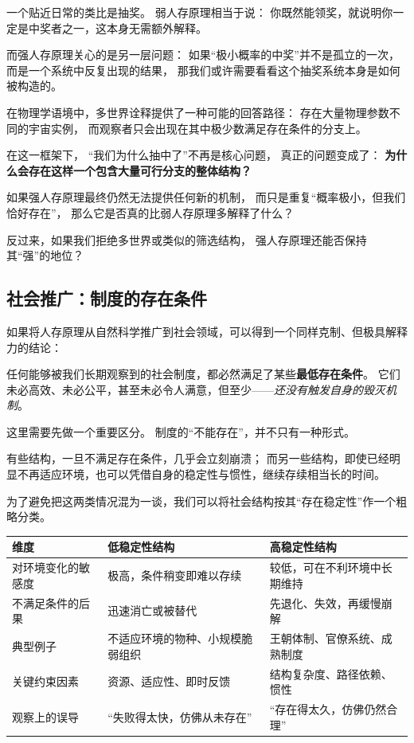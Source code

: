\documentclass[../main.tex]{subfiles}
\begin{document}
一个贴近日常的类比是抽奖。  
弱人存原理相当于说：  
你既然能领奖，就说明你一定是中奖者之一，这本身无需额外解释。

而强人存原理关心的是另一层问题：  
如果“极小概率的中奖”并不是孤立的一次，  
而是一个系统中反复出现的结果，  
那我们或许需要看看这个抽奖系统本身是如何被构造的。

在物理学语境中，多世界诠释提供了一种可能的回答路径：  
存在大量物理参数不同的宇宙实例，  
而观察者只会出现在其中极少数满足存在条件的分支上。

在这一框架下，  
“我们为什么抽中了”不再是核心问题，  
真正的问题变成了：  
\textbf{为什么会存在这样一个包含大量可行分支的整体结构？}

\begin{tcolorbox}[colback=gray!8, colframe=gray!50, title=\textit{思考}]
	如果强人存原理最终仍然无法提供任何新的机制，  
	而只是重复“概率极小，但我们恰好存在”，  
	那么它是否真的比弱人存原理多解释了什么？
	
	反过来，如果我们拒绝多世界或类似的筛选结构，  
	强人存原理还能否保持其“强”的地位？
\end{tcolorbox}


	\subsection{社会推广：制度的存在条件}
	
	如果将人存原理从自然科学推广到社会领域，可以得到一个同样克制、但极具解释力的结论：
	
	任何能够被我们长期观察到的社会制度，都必然满足了某些\textbf{最低存在条件}。  
	它们未必高效、未必公平，甚至未必令人满意，但至少——\textit{还没有触发自身的毁灭机制}。
	
	这里需要先做一个重要区分。  
	制度的“不能存在”，并不只有一种形式。
	
	有些结构，一旦不满足存在条件，几乎会立刻崩溃；  
	而另一些结构，即使已经明显不再适应环境，也可以凭借自身的稳定性与惯性，继续存续相当长的时间。
	
	为了避免把这两类情况混为一谈，我们可以将社会结构按其“存在稳定性”作一个粗略分类。
	
	
	\begin{center}
		\begin{tabular}{|p{3.5cm}|p{5cm}|p{5cm}|}
			\hline
			\textbf{维度} & \textbf{低稳定性结构} & \textbf{高稳定性结构} \\
			\hline
			对环境变化的敏感度 &
			极高，条件稍变即难以存续 &
			较低，可在不利环境中长期维持 \\
			\hline
			不满足条件的后果 &
			迅速消亡或被替代 &
			先退化、失效，再缓慢崩解 \\
			\hline
			典型例子 &
			不适应环境的物种、小规模脆弱组织 &
			王朝体制、官僚系统、成熟制度 \\
			\hline
			关键约束因素 &
			资源、适应性、即时反馈 &
			结构复杂度、路径依赖、惯性 \\
			\hline
			观察上的误导 &
			“失败得太快，仿佛从未存在” &
			“存在得太久，仿佛仍然合理” \\
			\hline
		\end{tabular}
	\end{center}
	
\end{document}
